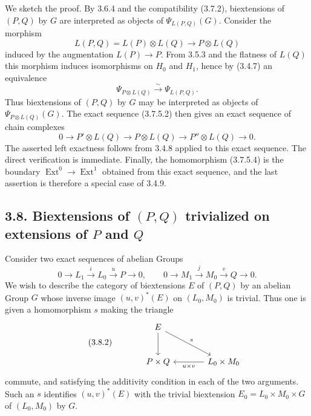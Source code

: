 \documentclass[11pt]{article}
\providecommand{\Ext}{\operatorname{Ext}}
\begin{document}
We sketch the proof.  By 3.6.4 and the compatibility (3.7.2), biextensions of \((P,Q)\) by \(G\) are interpreted as objects of \(\Psi_{L(P,Q)}(G)\).  Consider the morphism
\[
        L(P,Q)=L(P)\otimes L(Q)\longrightarrow P\otimes L(Q)
\]
induced by the augmentation \(L(P)\to P\).  From 3.5.3 and the flatness of \(L(Q)\) this morphism induces isomorphisms on \(H_0\) and \(H_1\), hence by (3.4.7) an equivalence
\[
        \Psi_{P\otimes L(Q)}\xrightarrow{\sim}\Psi_{L(P,Q)}.
\]
Thus biextensions of \((P,Q)\) by \(G\) may be interpreted as objects of \(\Psi_{P\otimes L(Q)}(G)\).  The exact sequence (3.7.5.2) then gives an exact sequence of chain complexes
\begin{equation}\tag{3.7.6.1}
        0\longrightarrow P'\otimes L(Q)
        \longrightarrow P\otimes L(Q)
        \longrightarrow P''\otimes L(Q)
        \longrightarrow 0.
\end{equation}
The asserted left exactness follows from 3.4.8 applied to this exact sequence.  The direct verification is immediate.  Finally, the homomorphism (3.7.5.4) is the boundary \(\Ext^0\to\Ext^1\) obtained from this exact sequence, and the last assertion is therefore a special case of 3.4.9.

\subsection*{3.8. Biextensions of \((P,Q)\) trivialized on extensions of \(P\) and \(Q\)}

Consider two exact sequences of abelian Groups
\begin{equation}\tag{3.8.1}
        0\longrightarrow L_1\xrightarrow{i}L_0\xrightarrow{u}P\longrightarrow 0,
        \qquad
        0\longrightarrow M_1\xrightarrow{j}M_0\xrightarrow{v}Q\longrightarrow 0.
\end{equation}
We wish to describe the category of biextensions \(E\) of \((P,Q)\) by an abelian Group \(G\) whose inverse image \((u,v)^*(E)\) on \((L_0,M_0)\) is trivial.  Thus one is given a homomorphism \(s\) making the triangle
\begin{equation}\tag{3.8.2}
\begin{tikzcd}[column sep=large,row sep=large]
& E \arrow[d] \arrow[dr,"s"]&\\
& P\times Q & L_0\times M_0 \arrow[l,"u\times v"]
\end{tikzcd}
\end{equation}
commute, and satisfying the additivity condition in each of the two arguments.  Such an \(s\) identifies \((u,v)^*(E)\) with the trivial biextension \(E_0=L_0\times M_0\times G\) of \((L_0,M_0)\) by \(G\).
\end{document}
